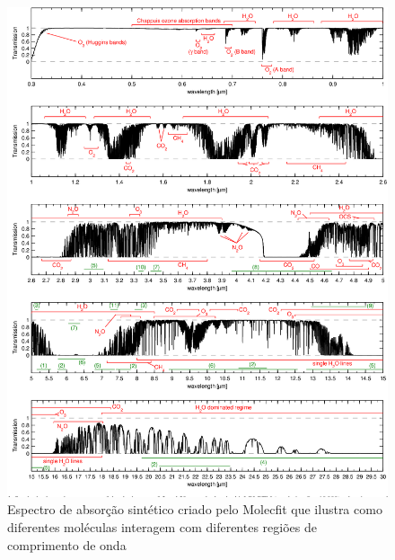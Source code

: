 \begin{figure}[!htb]
\centering
\includegraphics[width=15cm]{figuras/telluric_reference_molecfit.png}
\caption{Espectro de absorção sintético criado pelo Molecfit que ilustra como diferentes moléculas interagem com diferentes regiões de comprimento de onda \citep{smette2015molecfit}}
\label{fig:molectfit-telluric-reference}
\end{figure}



